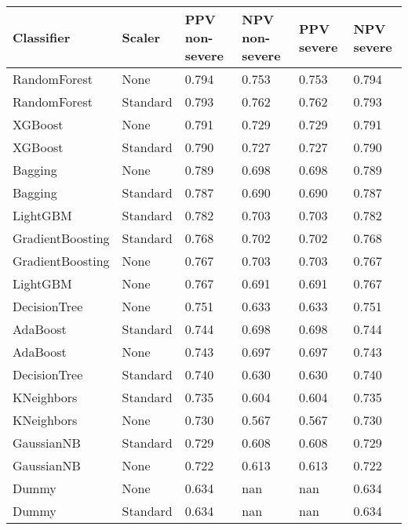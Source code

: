 \begin{tabular}{llllll}
\toprule
Classifier & Scaler & PPV non-severe & NPV non-severe & PPV severe & NPV severe \\
\midrule
RandomForest & None & 0.794 & 0.753 & 0.753 & 0.794 \\
RandomForest & Standard & 0.793 & 0.762 & 0.762 & 0.793 \\
XGBoost & None & 0.791 & 0.729 & 0.729 & 0.791 \\
XGBoost & Standard & 0.790 & 0.727 & 0.727 & 0.790 \\
Bagging & None & 0.789 & 0.698 & 0.698 & 0.789 \\
Bagging & Standard & 0.787 & 0.690 & 0.690 & 0.787 \\
LightGBM & Standard & 0.782 & 0.703 & 0.703 & 0.782 \\
GradientBoosting & Standard & 0.768 & 0.702 & 0.702 & 0.768 \\
GradientBoosting & None & 0.767 & 0.703 & 0.703 & 0.767 \\
LightGBM & None & 0.767 & 0.691 & 0.691 & 0.767 \\
DecisionTree & None & 0.751 & 0.633 & 0.633 & 0.751 \\
AdaBoost & Standard & 0.744 & 0.698 & 0.698 & 0.744 \\
AdaBoost & None & 0.743 & 0.697 & 0.697 & 0.743 \\
DecisionTree & Standard & 0.740 & 0.630 & 0.630 & 0.740 \\
KNeighbors & Standard & 0.735 & 0.604 & 0.604 & 0.735 \\
KNeighbors & None & 0.730 & 0.567 & 0.567 & 0.730 \\
GaussianNB & Standard & 0.729 & 0.608 & 0.608 & 0.729 \\
GaussianNB & None & 0.722 & 0.613 & 0.613 & 0.722 \\
Dummy & None & 0.634 & nan & nan & 0.634 \\
Dummy & Standard & 0.634 & nan & nan & 0.634 \\
\bottomrule
\end{tabular}
